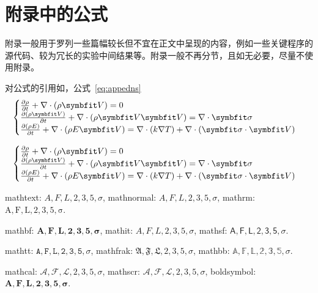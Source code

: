 
\chapter{附录中的公式}\label{chap:app1}
附录一般用于罗列一些篇幅较长但不宜在正文中呈现的内容，例如一些关键程序的源代码、较为冗长的实验中间结果等。附录一般不再分节，且如无必要，尽量不使用附录。

对公式的引用如，公式~\eqref{eq:appedns}
\begin{equation} \label{eq:appedns}
    \begin{cases}
        \frac{\partial \rho}{\partial t} + \nabla\cdot(\rho\Vector{V}) = 0\\
        \frac{\partial (\rho\Vector{V})}{\partial t} + \nabla\cdot(\rho\Vector{V}\Vector{V}) = \nabla\cdot\Tensor{\sigma}\\
        \frac{\partial (\rho E)}{\partial t} + \nabla\cdot(\rho E\Vector{V}) = \nabla\cdot(k\nabla T) + \nabla\cdot(\Tensor{\sigma}\cdot\Vector{V})
    \end{cases}
\end{equation}

\begin{equation} \label{eq:appedns2}
    \begin{cases}
        \frac{\partial \rho}{\partial t} + \nabla\cdot(\rho\Vector{V}) = 0\\
        \frac{\partial (\rho\Vector{V})}{\partial t} + \nabla\cdot(\rho\Vector{V}\Vector{V}) = \nabla\cdot\Tensor{\sigma}\\
        \frac{\partial (\rho E)}{\partial t} + \nabla\cdot(\rho E\Vector{V}) = \nabla\cdot(k\nabla T) + \nabla\cdot(\Tensor{\sigma}\cdot\Vector{V})
    \end{cases}
\end{equation}


mathtext: $A,F,L,2,3,5,\sigma$, mathnormal: $A,F,L,2,3,5,\sigma$, mathrm: $\mathrm{A,F,L,2,3,5,\sigma}$.

mathbf: $\mathbf{A,F,L,2,3,5,\sigma}$, mathit: $\mathit{A,F,L,2,3,5,\sigma}$, mathsf: $\mathsf{A,F,L,2,3,5,\sigma}$.

mathtt: $\mathtt{A,F,L,2,3,5,\sigma}$, mathfrak: $\mathfrak{A,F,L,2,3,5,\sigma}$, mathbb: $\mathbb{A,F,L,2,3,5,\sigma}$.

mathcal: $\mathcal{A,F,L,2,3,5,\sigma}$, mathscr: $\mathscr{A,F,L,2,3,5,\sigma}$, boldsymbol: $\boldsymbol{A,F,L,2,3,5,\sigma}$.

